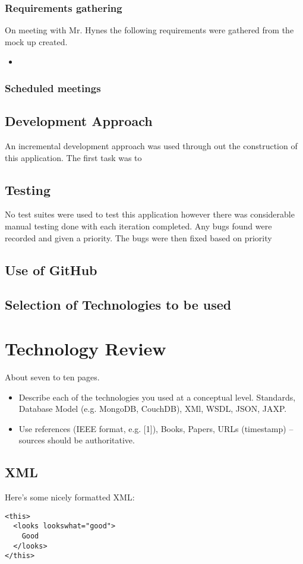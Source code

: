 \subsection {Requirements gathering}
On meeting with Mr. Hynes the following requirements were gathered from the mock up created.
\begin{itemize}
	\item 
\end{itemize}
\subsection {Scheduled meetings}

\section{Development Approach}
An incremental development approach was used through out the construction of this application. The first task was to 
\section{Testing}
No test suites were used to test this application however there was considerable manual testing done with each iteration completed. Any bugs found were recorded and given a priority. The bugs were then fixed based on priority 
\section{Use of GitHub}
\section{Selection of Technologies to be used}




\chapter{Technology Review}
About seven to ten pages.
\begin{itemize}
\item Describe each of the technologies you used at a conceptual level. Standards, Database Model (e.g. MongoDB, CouchDB), XMl, WSDL, JSON, JAXP.
\item Use references (IEEE format, e.g. [1]), Books, Papers, URLs (timestamp) – sources should be authoritative. 
\end{itemize}

\section{XML}
Here's some nicely formatted XML:
\begin{verbatim}
<this>
  <looks lookswhat="good">
    Good
  </looks>
</this>
\end{verbatim}

